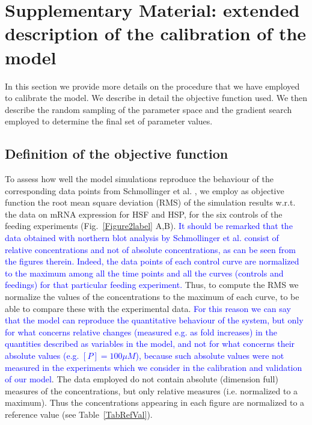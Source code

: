 \documentclass[oneside, 10pt, a4paper, twocolumn]{article}
\begin{document}
\clearpage




\section{Supplementary Material: extended description of the calibration of the model}
\label{SecCalibrationExtended}

In this section we provide more details on the procedure that we have employed to calibrate the model. We describe in detail the objective function used. We then describe the random sampling of the parameter space and the gradient search employed to determine the final set of parameter values.

\subsection{Definition of the objective function}

To assess how well the model simulations reproduce the behaviour of the corresponding data points from Schmollinger et al. \cite{Schmollinger2013}, we employ as objective function the root mean square deviation (RMS) of the simulation results w.r.t. the data on mRNA expression for HSF and HSP, for the six controls of the feeding experiments (Fig.~\ref{Figure2label} A,B). 
\textcolor{blue}{It should be remarked that the data obtained with northern blot analysis by Schmollinger et al. \cite{Schmollinger2013} consist of relative concentrations and not of absolute concentrations, as can be seen from the figures therein. Indeed, the data points of each control curve are normalized to the maximum among all the time points and all the curves (controls and feedings) for that particular feeding experiment.} Thus, to compute the RMS we normalize the values of the concentrations to the maximum of each curve, to be able to compare these with the experimental data. \textcolor{blue}{For this reason we can say that the model can reproduce the quantitative behaviour of the system, but only for what concerns relative changes (measured e.g. as fold increases) in the quantities described as variables in the model, and not for what concerns their absolute values (e.g. 
$\left[ P \right]=100 \mu M$), because such absolute values were not measured in the experiments which we consider in the calibration and validation of our model}. The data employed do not contain absolute (dimension full) measures of the concentrations, but only relative measures (i.e. normalized to a maximum). Thus the concentrations appearing in each figure are normalized to a reference value (see Table~\ref{TabRefVal}).
\end{document}
